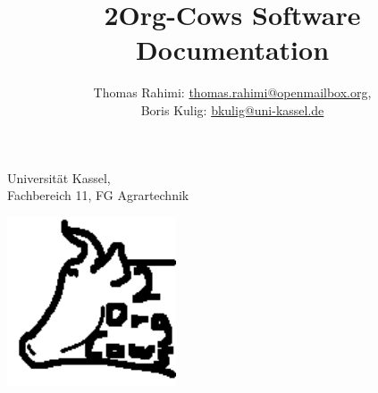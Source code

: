\documentclass[a4paper,12pt]{article}
\title{2Org-Cows Software Documentation}
\author{Thomas Rahimi: \href{mailto:thomas.rahimi@openmailbox.org}{thomas.rahimi@openmailbox.org},\\ Boris Kulig: \href{mailto:bkulig@uni-kassel.de}{bkulig@uni-kassel.de}}
\date{}
\begin{document}
\maketitle
\begin{center}
 Universität Kassel,\\
 Fachbereich 11,
 FG Agrartechnik
\end{center}

\bigskip

\begin{center}
 \includegraphics[width=5cm,keepaspectratio=true]{./Logo-2Org-Cows.png}
\end{center}
\thispagestyle{empty}
\newpage

\clearpage
\tableofcontents
{} %
\thispagestyle{empty}
\newpage














\end{document}
